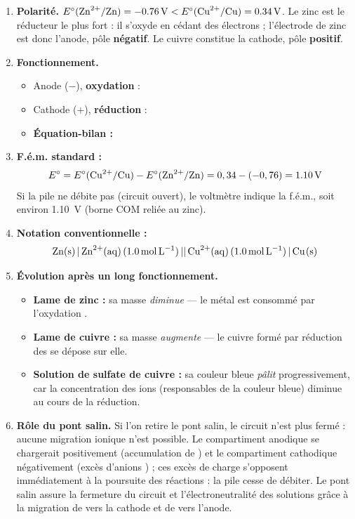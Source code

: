 \documentclass[11pt]{article}
\newcommand{\cle}[1]{{\popxbold\color{popdark}#1}}
\begin{document}
\begin{corrige}
\begin{enumerate}
\item \textbf{Polarité.} $E^{\circ}(\ce{Zn^2+}/\ce{Zn}) = \SI{-0,76}{V} < E^{\circ}(\ce{Cu^2+}/\ce{Cu}) = \SI{+0,34}{V}$. Le zinc est le réducteur le plus fort : il s'oxyde en cédant des électrons ; l'électrode de zinc est donc l'anode, pôle \textbf{négatif}. Le cuivre constitue la cathode, pôle \textbf{positif}.
\item \textbf{Fonctionnement.}
\begin{itemize}
\item Anode ($-$), \textbf{oxydation} : 
\item Cathode ($+$), \textbf{réduction} : 
\item \textbf{Équation-bilan :} 
\end{itemize}
\item \textbf{F.é.m. standard :}
\[ E^{\circ} = E^{\circ}(\ce{Cu^2+}/\ce{Cu}) - E^{\circ}(\ce{Zn^2+}/\ce{Zn}) = 0,34 - (-0,76) = \SI{+1,10}{V} \]
Si la pile ne débite pas (circuit ouvert), le voltmètre indique la f.é.m., soit environ \SI{1,10}{V} (borne COM reliée au zinc).
\item \textbf{Notation conventionnelle :}
\[ \ce{Zn(s) | Zn^2+(aq) (\SI{1,0}{mol.L^{-1}}) || Cu^2+(aq) (\SI{1,0}{mol.L^{-1}}) | Cu(s)} \]
\item \textbf{Évolution après un long fonctionnement.}
\begin{itemize}
\item \textbf{Lame de zinc :} sa masse \emph{diminue} — le métal est consommé par l'oxydation .
\item \textbf{Lame de cuivre :} sa masse \emph{augmente} — le cuivre formé par réduction des  se dépose sur elle.
\item \textbf{Solution de sulfate de cuivre :} sa couleur bleue \emph{pâlit} progressivement, car la concentration des ions  (responsables de la couleur bleue) diminue au cours de la réduction.
\end{itemize}
\item \textbf{Rôle du pont salin.} Si l'on retire le pont salin, le circuit n'est plus fermé : aucune migration ionique n'est possible. Le compartiment anodique se chargerait positivement (accumulation de ) et le compartiment cathodique négativement (excès d'anions ) ; ces excès de charge s'opposent immédiatement à la poursuite des réactions : la pile cesse de débiter. Le pont salin assure la \cle{fermeture du circuit} et l'\cle{électroneutralité} des solutions grâce à la migration de  vers la cathode et de  vers l'anode.

\end{enumerate}
\end{corrige}
\end{document}
